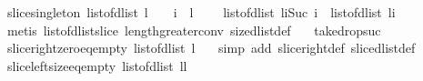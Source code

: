 \begin{isabellebody}
%
\isadelimproof
\isanewline
%
\endisadelimproof
\isanewline
{}\isamarkupfalse%
\ slice{\isacharunderscore}singleton{\isacharcolon}\ {\isachardoublequoteopen}{\isacharparenleft}list{\isacharunderscore}of{\isacharunderscore}dlist\ l{\isacharparenright}\ {\isasymnoteq}\ {\isacharbrackleft}{\isacharbrackright}\ {\isasymLongrightarrow}\ i\ {\isacharless}\ {\isacharparenleft}{\isacharhash}l{\isacharparenright}\ {\isasymLongrightarrow}\ \isanewline
\ \ list{\isacharunderscore}of{\isacharunderscore}dlist\ {\isacharparenleft}l{\isasymdagger}i{\isachardot}{\isachardot}{\isacharparenleft}Suc\ i{\isacharparenright}{\isacharparenright}\ {\isacharequal}\ {\isacharbrackleft}{\isacharparenleft}list{\isacharunderscore}of{\isacharunderscore}dlist\ l{\isacharparenright}{\isacharbang}i{\isacharbrackright}{\isachardoublequoteclose}\isanewline
%
\isadelimproof
%
\endisadelimproof
%
\isatagproof
{}\isamarkupfalse%
\ {\isacharparenleft}metis\ list{\isacharunderscore}of{\isacharunderscore}dlist{\isacharunderscore}slice\ length{\isacharunderscore}greater{\isacharunderscore}{}{\isacharunderscore}conv\ size{\isacharunderscore}dlist{\isacharunderscore}def\ \isanewline
\ \ take{\isacharunderscore}drop{\isacharunderscore}suc{\isacharparenright}%
\endisatagproof
{\isafoldproof}%
%
\isadelimproof
\isanewline
%
\endisadelimproof
\isanewline
{}\isamarkupfalse%
\ slice{\isacharunderscore}right{\isacharunderscore}zero{\isacharunderscore}eq{\isacharunderscore}empty{\isacharcolon}\ {\isachardoublequoteopen}list{\isacharunderscore}of{\isacharunderscore}dlist\ {\isacharparenleft}l{\isasymdagger}{\isachardot}{\isachardot}{}{\isacharparenright}\ {\isacharequal}\ {\isacharbrackleft}{\isacharbrackright}{\isachardoublequoteclose}\isanewline
%
\isadelimproof
%
\endisadelimproof
%
\isatagproof
{}\isamarkupfalse%
\ {\isacharparenleft}simp\ add{\isacharcolon}\ slice{\isacharunderscore}right{\isacharunderscore}def\ slice{\isacharunderscore}dlist{\isacharunderscore}def{\isacharparenright}%
\endisatagproof
{\isafoldproof}%
%
\isadelimproof
\isanewline
%
\endisadelimproof
\isanewline
{}\isamarkupfalse%
\ slice{\isacharunderscore}left{\isacharunderscore}size{\isacharunderscore}eq{\isacharunderscore}empty{\isacharcolon}\ {\isachardoublequoteopen}list{\isacharunderscore}of{\isacharunderscore}dlist\ {\isacharparenleft}l{\isasymdagger}{\isacharparenleft}{\isacharhash}l{\isacharparenright}{\isachardot}{\isachardot}{\isacharparenright}\ {\isacharequal}\ {\isacharbrackleft}{\isacharbrackright}{\isachardoublequoteclose}\isanewline

\end{isabellebody}
